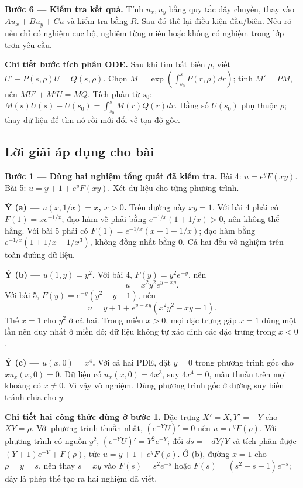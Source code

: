 \documentclass[10pt,a4paper]{article}
\begin{document}
\textbf{Bước 6 — Kiểm tra kết quả.} Tính $u_x,u_y$ bằng quy tắc dây chuyền, thay vào $Au_x+Bu_y+Cu$ và kiểm tra bằng $R$. Sau đó thế lại điều kiện đầu/biên. Nêu rõ nếu chỉ có nghiệm cục bộ, nghiệm từng miền hoặc không có nghiệm trong lớp trơn yêu cầu.

\textbf{Chi tiết bước tích phân ODE.} Sau khi tìm bất biến $\rho$, viết $U'+P(s,\rho)U=Q(s,\rho)$. Chọn $M=\exp(\int_{s_0}^{s}P(r,\rho)dr)$; tính $M'=PM$, nên $MU'+M'U=MQ$. Tích phân từ $s_0$: $M(s)U(s)-U(s_0)=\int_{s_0}^sM(r)Q(r)dr$. Hằng số $U(s_0)$ phụ thuộc $\rho$; thay dữ liệu để tìm nó rồi mới đổi về tọa độ gốc.
\subsection*{Lời giải áp dụng cho bài}
\textbf{Bước 1 — Dùng hai nghiệm tổng quát đã kiểm tra.} Bài 4: $u=e^yF(xy)$. Bài 5: $u=y+1+e^yF(xy)$. Xét dữ liệu cho từng phương trình.

\textbf{Ý (a) — $u(x,1/x)=x$, $x>0$.} Trên đường này $xy=1$. Với bài 4 phải có $F(1)=xe^{-1/x}$; đạo hàm vế phải bằng $e^{-1/x}(1+1/x)>0$, nên không thể hằng. Với bài 5 phải có $F(1)=e^{-1/x}(x-1-1/x)$; đạo hàm bằng $e^{-1/x}(1+1/x-1/x^3)$, không đồng nhất bằng 0. Cả hai đều vô nghiệm trên toàn đường dữ liệu.

\textbf{Ý (b) — $u(1,y)=y^2$.} Với bài 4, $F(y)=y^2e^{-y}$, nên
\[u=x^2y^2e^{y-xy}.\]
Với bài 5, $F(y)=e^{-y}(y^2-y-1)$, nên
\[u=y+1+e^{y-xy}(x^2y^2-xy-1).\]
Thế $x=1$ cho $y^2$ ở cả hai. Trong miền $x>0$, mọi đặc trưng gặp $x=1$ đúng một lần nên duy nhất ở miền đó; dữ liệu không tự xác định các đặc trưng trong $x<0$.

\textbf{Ý (c) — $u(x,0)=x^4$.} Với cả hai PDE, đặt $y=0$ trong phương trình gốc cho $xu_x(x,0)=0$. Dữ liệu có $u_x(x,0)=4x^3$, suy $4x^4=0$, mâu thuẫn trên mọi khoảng có $x\ne0$. Vì vậy vô nghiệm. Dùng phương trình gốc ở đường suy biến tránh chia cho $y$.

\textbf{Chi tiết hai công thức dùng ở bước 1.} Đặc trưng $X'=X,Y'=-Y$ cho $XY=\rho$. Với phương trình thuần nhất, $(e^{-Y}U)'=0$ nên $u=e^yF(\rho)$. Với phương trình có nguồn $y^2$, $(e^{-Y}U)'=Y^2e^{-Y}$; đổi $ds=-dY/Y$ và tích phân được $(Y+1)e^{-Y}+F(\rho)$, tức $u=y+1+e^yF(\rho)$. Ở (b), đường $x=1$ cho $\rho=y=s$, nên thay $s=xy$ vào $F(s)=s^2e^{-s}$ hoặc $F(s)=(s^2-s-1)e^{-s}$; đây là phép thế tạo ra hai nghiệm đã viết.
\end{document}
